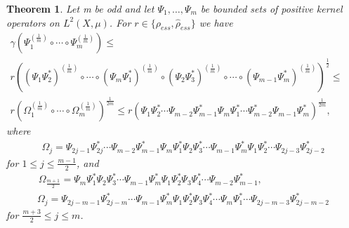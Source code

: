 \documentclass[12pt, reqno]{amsart}
\newtheorem{theorem}{Theorem}[section]
\theoremstyle{definition}
\theoremstyle{remark}
\numberwithin{equation}{section}
\begin{document}
\begin{theorem}
\label{kety_ess}
Let m be odd and let $\Psi_1, \ldots, \Psi_m$ be bounded sets of positive kernel operators on $L^2(X, \mu)$. For $r\in\{\rho_{ess}, \hat{\rho}_{ess}\}$ we have
\begin{align}
\nonumber
\gamma (\Psi_1^{(\frac{1}{m})}\circ\cdots\circ\Psi_m^{(\frac{1}{m})})\le\;\;\;\;\;\;\;\;\;\;\;\;\;\;\;\;\;\;\;\;\;\;\;\;\;\;\;\;\;\;\;\;\;\;\;\;\;\;\;\;\;\;\;\;\;\;\;\;\;\;\;\;\;\;\;\;\;\;\;\;\;\;\;\;\;\;\;\;\;\;\;\;\;\;\;\;\;\;\;\;\;\\
\nonumber
	r((\Psi_1\Psi_2^*)^{(\frac{1}{m})}\circ\cdots\circ
(\Psi_{m}\Psi_1^*)^{(\frac{1}{m})}\circ(\Psi_2\Psi_3^*)^{(\frac{1}{m})}\circ\cdots\circ(\Psi_{m-1}\Psi_{m}^*)^{(\frac{1}{m})})^{\frac{1}{2}}\le\;\;\;\;\;\;\;\;\;\\
r(\Omega_1^{(\frac{1}{m})}\circ\cdots\circ\Omega_m^{(\frac{1}{m})})^{\frac{1}{2m}}\le r(\Psi_1\Psi_2^*
\cdots\Psi_{m-2}\Psi_{m-1}^*\Psi_m\Psi_1^*
\cdots\Psi_{m-2}^*\Psi_{m-1}\Psi_m^*)^{\frac{1}{2m}},
\label{laufen_ess}
\end{align}
where 
\begin{align}
\nonumber
\Omega_j=\Psi_{2j-1}\Psi_{2j}^*
\cdots\Psi_{m-2}\Psi_{m-1}^*\Psi_m\Psi_1^*\Psi_2\Psi_3^*\cdots\Psi_{m-1}\Psi_{m}^*\Psi_1\Psi_2^*\cdots\Psi_{2j-3}\Psi_{2j-2}^*
\end{align}
for\; $1\le j\le \frac{m-1}{2}$, and
\begin{align}
\nonumber
\Omega_{\frac{m+1}{2}}=\Psi_m\Psi_1^*\Psi_2\Psi_3^*\cdots\Psi_{m-1}\Psi_{m}^*\Psi_1\Psi_2^*\Psi_3\Psi_4^*\cdots\Psi_{m-2}\Psi_{m-1}^*,\;\;\;\;\;\;\;\;\;\;\;\;\;\;\;\;\;\;\;\;\;\;\;\;
\end{align}
\begin{align}
\nonumber
\Omega_j=\Psi_{2j-m-1}\Psi_{2j-m}^*
\cdots\Psi_{m-1}\Psi_m^*\Psi_1\Psi_2^*\Psi_3\Psi_4^*\cdots\Psi_m\Psi_1^*\cdots\Psi_{2j-m-3}\Psi_{2j-m-2}^*
\end{align}
for\; $\frac{m+3}{2}\le j \le m$.
\end{theorem}

\medskip
\end{document}

